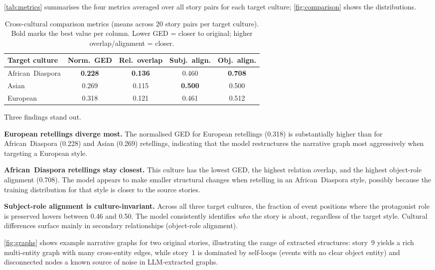 \documentclass[11pt,a4paper]{article}
\begin{document}
\autoref{tab:metrics} summarises the four metrics averaged over all story pairs
for each target culture; \autoref{fig:comparison} shows the distributions.

\begin{table}[h]
  \centering
  \begin{tabular}{lcccc}
    \toprule
    Target culture & Norm.\ GED & Rel.\ overlap & Subj.\ align. & Obj.\ align. \\
    \midrule
    African~Diaspora & \textbf{0.228} & \textbf{0.136} & 0.460 & \textbf{0.708} \\
    Asian            & 0.269          & 0.115          & \textbf{0.500} & 0.500 \\
    European         & 0.318          & 0.121          & 0.461 & 0.512 \\
    \bottomrule
  \end{tabular}
  \caption{Cross-cultural comparison metrics (means across 20 story pairs per
           target culture).  Bold marks the best value per column.
           Lower GED = closer to original; higher overlap/alignment = closer.}
  \label{tab:metrics}
\end{table}

Three findings stand out.

\textbf{European retellings diverge most.}  The normalised GED for European
retellings (0.318) is substantially higher than for African~Diaspora (0.228)
and Asian (0.269) retellings, indicating that the model restructures the
narrative graph most aggressively when targeting a European style.

\textbf{African~Diaspora retellings stay closest.}  This culture has the
lowest GED, the highest relation overlap, and the highest object-role alignment
(0.708).  The model appears to make smaller structural changes when retelling in
an African~Diaspora style, possibly because the training distribution for that
style is closer to the source stories.

\textbf{Subject-role alignment is culture-invariant.}  Across all three target
cultures, the fraction of event positions where the protagonist role is preserved
hovers between 0.46 and 0.50.  The model consistently identifies \emph{who} the
story is about, regardless of the target style.  Cultural differences surface
mainly in secondary relationships (object-role alignment).

\autoref{fig:graphs} shows example narrative graphs for two original stories,
illustrating the range of extracted structures: story~9 yields a rich
multi-entity graph with many cross-entity edges, while story~1 is dominated by
self-loops (events with no clear object entity) and disconnected nodes a
known source of noise in LLM-extracted graphs.
\end{document}
